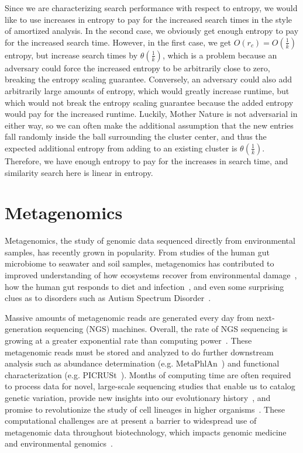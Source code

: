 \documentclass{amsbook}
\theoremstyle{definition}
\theoremstyle{remark}
\numberwithin{equation}{section}
\begin{document}
Since we are characterizing search performance with respect to entropy, we would like to use increases in entropy to pay for the increased search times in the style of amortized analysis.
In the second case, we obviously get enough entropy to pay for the increased search time.
However, in the first case, we get $O(r_c) = O\left( \frac{1}{k} \right)$ entropy, but increase search times by $\theta\left(\frac{1}{k}\right)$, which is a problem because an adversary could force the increased entropy to be arbitrarily close to zero, breaking the entropy scaling guarantee.
Conversely, an adversary could also add arbitrarily large amounts of entropy, which would greatly increase runtime, but which would not break the entropy scaling guarantee because the added entropy would pay for the increased runtime.
Luckily, Mother Nature is not adversarial in either way, so we can often make the additional assumption that the new entries fall randomly inside the ball surrounding the cluster center, and thus the expected additional entropy from adding to an existing cluster is $\theta\left(\frac{1}{k}\right)$.
Therefore, we have enough entropy to pay for the increases in search time, and similarity search here is linear in entropy.

\section*{Metagenomics}

Metagenomics, the study of genomic data sequenced directly from environmental
samples, has recently grown in popularity.
From studies of the human gut microbiome to seawater and soil samples,
metagenomics has contributed to improved understanding of how ecosystems recover
from environmental damage~\cite{Tyson:2004}, how the human gut responds to 
diet
and infection~\cite{David:2014}, and even some surprising clues as to disorders 
such as Autism Spectrum Disorder~\cite{MacFabe:2012}.

Massive amounts of metagenomic reads are generated every day from 
next-generation sequencing (NGS) machines.
Overall, the rate of NGS sequencing is growing at a greater exponential rate
than computing power~\cite{Loh}.
These metagenomic reads must be stored and analyzed to do further downstream
analysis such as abundance determination (e.g. MetaPhlAn~\cite{Huttenhower}) 
and functional characterization (e.g. PICRUSt~\cite{Huttenhower}).
 Months of computing time are often required to process data for novel, 
large-scale sequencing studies that enable us to catalog genetic variation, 
provide new insights into our evolutionary history~\cite{8}, and promise to 
revolutionize the study of cell lineages in higher organisms~\cite{9}. 
These computational challenges are at present a barrier to widespread use of 
metagenomic data throughout biotechnology, which impacts genomic medicine and 
environmental genomics~\cite{blah}.
\end{document}
